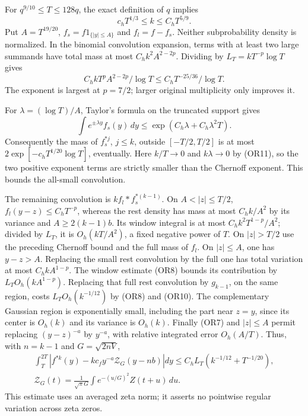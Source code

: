 \documentclass[11pt,a4paper]{article}
\begin{document}
For \(q^{9/10}\leq T\leq128q\), the exact definition of \(q\) implies
\[
 c_hT^{1/3}\leq k\leq C_hT^{5/9}.                    \tag{OR11}
\]
Put \(A=T^{19/20}\), \(f_s=f1_{\{|y|\leq A\}}\) and \(f_l=f-f_s\).
Neither subprobability density is normalized.  In the binomial
convolution expansion, terms with at least two large summands have
total mass at most \(C_hk^2A^{2-2p}\).  Dividing by
\(L_T=kT^{-p}\log T\) gives
\[
 C_h kT^pA^{2-2p}/\log T
 \leq C_hT^{-25/36}/\log T.                           \tag{OR12}
\]
The exponent is largest at \(p=7/2\); larger original multiplicity
only improves it.

For \(\lambda=(\log T)/A\), Taylor's formula on the truncated support
gives
\[
 \int e^{\pm\lambda y}f_s(y)\,dy
 \leq\exp(C_h\lambda+C_h\lambda^2T).
\]
Consequently the mass of \(f_s^{*j}\), \(j\leq k\), outside
\([-T/2,T/2]\) is at most
\(2\exp[-c_hT^{1/20}\log T]\), eventually.  Here
\(k/T\to0\) and \(k\lambda\to0\) by (OR11), so the two positive
exponent terms are strictly smaller than the Chernoff exponent.
This bounds the all-small convolution.

The remaining convolution is \(k f_l*f_s^{*(k-1)}\).
On \(A<|z|\leq T/2\), \(f_l(y-z)\leq C_hT^{-p}\), whereas the
rest density has mass at most \(C_h k/A^2\) by its variance and
\(A\geq2(k-1)b\).  Its window integral is at most
\(C_hk^2T^{1-p}/A^2\); divided by \(L_T\), it is
\(O_h(kT/A^2)\), a fixed negative power of \(T\).
On \(|z|>T/2\) use the preceding Chernoff bound and the full mass
of \(f_l\).  On \(|z|\leq A\), one has \(y-z>A\).
Replacing the small rest convolution by the full one has total
variation at most \(C_hkA^{1-p}\).  The window estimate (OR8) bounds
its contribution by \(L_TO_h(kA^{1-p})\).
Replacing that full rest convolution by \(g_{k-1}\), on the same
region, costs \(L_TO_h(k^{-1/12})\) by (OR8) and (OR10).
The complementary Gaussian region is exponentially small, including
the part near \(z=y\), since its center is \(O_h(k)\) and its
variance is \(O_h(k)\).
Finally (OR7) and \(|z|\leq A\) permit replacing
\((y-z)^{-a}\) by \(y^{-a}\), with relative integrated error
\(O_h(A/T)\).  Thus, with \(n=k-1\) and \(G=\sqrt{2nV}\),
\[
\begin{gathered}
 \int_T^{2T}\left|f^{*k}(y)-kc_fy^{-a}\mathcal Z_G(y-nb)\right|dy
 \leq C_h L_T(k^{-1/12}+T^{-1/20}),\\
 \mathcal Z_G(t)=\frac1{\sqrt\pi G}\int e^{-(u/G)^2}Z(t+u)\,du .
  \end{gathered}\tag{OR13}
\]
This estimate uses an averaged zeta norm; it asserts no pointwise
regular variation across zeta zeros.
\end{document}
